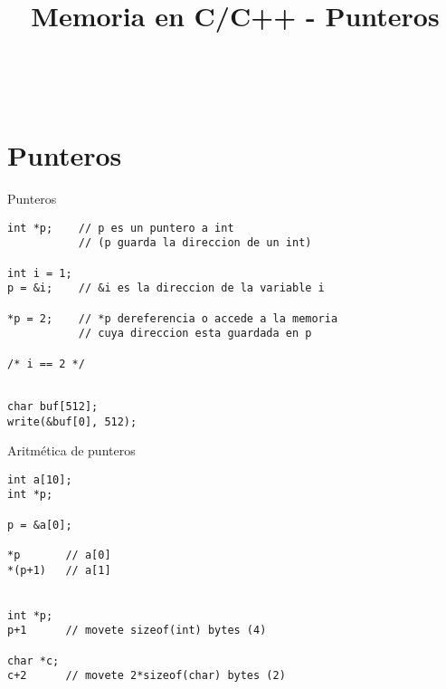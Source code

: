 

\title%
{Memoria en C/C++ - Punteros}


\subject{Memoria en C/C++ - Punteros}




\begin{frame}
   \titlepage
\end{frame}


~%
\section{Punteros}
\begin{frame}[fragile]{Punteros}
         \begin{lstlisting}[style=normal]
int *p;    // p es un puntero a int
           // (p guarda la direccion de un int)

int i = 1;
p = &i;    // &i es la direccion de la variable i

*p = 2;    // *p dereferencia o accede a la memoria
           // cuya direccion esta guardada en p

/* i == 2 */

         \end{lstlisting}
         \begin{lstlisting}[style=normal]

char buf[512];
write(&buf[0], 512);

         \end{lstlisting}
\end{frame}

\begin{frame}[fragile]{Aritm\'etica de punteros}
         \begin{lstlisting}[style=normal]
int a[10];
int *p;

p = &a[0];

*p       // a[0]
*(p+1)   // a[1]


int *p;
p+1      // movete sizeof(int) bytes (4)

char *c;
c+2      // movete 2*sizeof(char) bytes (2)

         \end{lstlisting}
\end{frame}

